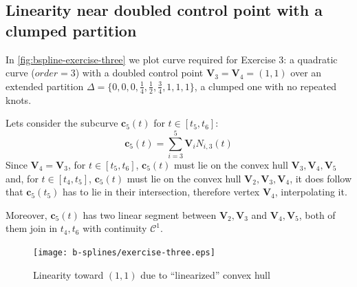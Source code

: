 \documentclass{article}
\begin{document}
\subsection{Linearity near doubled control point with a clumped partition}
In \autoref{fig:bspline-exercise-three} we plot curve required for Exercise 3:
a quadratic curve ($order = 3$) with a doubled control point $\mathbf{V}_{3} =
\mathbf{V}_{4} = (1,1)$ over an extended partition
$\Delta = \lbrace 0,0,0, \frac{1}{4},\frac{1}{2},\frac{3}{4},
1,1,1 \rbrace$, a clumped one with no repeated knots.

Lets consider the subcurve $\mathbf{c}_{5}(t)$ for $t \in [t_{5}, t_{6}]$:
\begin{displaymath}
    \mathbf{c}_{5}(t) = \sum_{i=3}^{5}{\mathbf{V}_{i}N_{i,3}(t)}
\end{displaymath}
Since $\mathbf{V}_{4} = \mathbf{V}_{3}$, for $t \in [t_{5}, t_{6}]$,
$\mathbf{c}_{5}(t)$ must lie on the convex hull $\mathbf{V}_{3}, \mathbf{V}_{4},
\mathbf{V}_{5}$ and,  for $t \in [t_{4}, t_{5}]$, $\mathbf{c}_{5}(t)$ must lie
on the convex hull $\mathbf{V}_{2}, \mathbf{V}_{3}, \mathbf{V}_{4}$, it does follow
that $\mathbf{c}_{5}(t_{5})$ has to lie in their intersection, therefore vertex
$\mathbf{V}_{4}$, interpolating it.

Moreover, $\mathbf{c}_{5}(t)$ has two linear segment between
$\mathbf{V}_{2}, \mathbf{V}_{3}$ and $\mathbf{V}_{4}, \mathbf{V}_{5}$,
both of them join in $t_{4}, t_{6}$ with continuity $\mathcal{C}^{1}$.


\begin{figure}[h!]
  \centering
  \texttt{[image: b-splines/exercise-three.eps]}
  \caption{Linearity toward $(1,1)$ due to ``linearized'' convex hull}
  \label{fig:bspline-exercise-three}
\end{figure}
\end{document}

